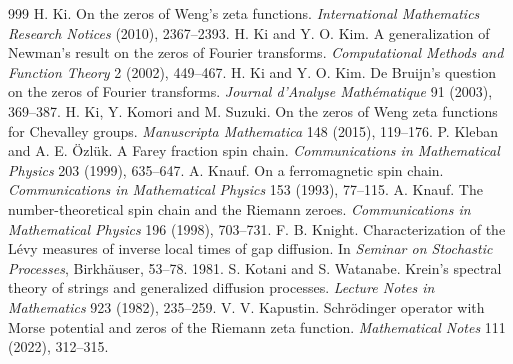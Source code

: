 \begin{thebibliography}{999}
 H. Ki. On the zeros of Weng's zeta functions. \emph{International Mathematics Research Notices} (2010), 2367--2393.
 H. Ki and Y. O. Kim. A generalization of Newman's result on the zeros of Fourier transforms. \emph{Computational Methods and Function Theory} 2 (2002), 449--467.
 H. Ki and Y. O. Kim. De Bruijn's question on the zeros of Fourier transforms. \emph{Journal d'Analyse Math\'ematique} 91 (2003), 369--387.
 H. Ki, Y. Komori and M. Suzuki. On the zeros of Weng zeta functions for Chevalley groups. \emph{Manuscripta Mathematica} 148 (2015), 119--176.
 P. Kleban and A. E. \"Ozl\"uk. A Farey fraction spin chain. \emph{Communications in Mathematical Physics} 203 (1999), 635--647.
 A. Knauf. On a ferromagnetic spin chain. \emph{Communications in Mathematical Physics} 153 (1993), 77--115.
 A. Knauf. The number-theoretical spin chain and the Riemann zeroes. \emph{Communications in Mathematical Physics} 196 (1998), 703--731.
 F. B. Knight. Characterization of the L\'evy measures of inverse local times of gap diffusion. In \emph{Seminar on Stochastic Processes}, Birkh\"auser, 53--78. 1981.
 S. Kotani and S. Watanabe. Krein's spectral theory of strings and generalized diffusion processes. \emph{Lecture Notes in Mathematics} 923 (1982), 235--259.
 V. V. Kapustin. Schr\"odinger operator with Morse potential and zeros of the Riemann zeta function. \emph{Mathematical Notes} 111 (2022), 312--315.

\end{thebibliography}
